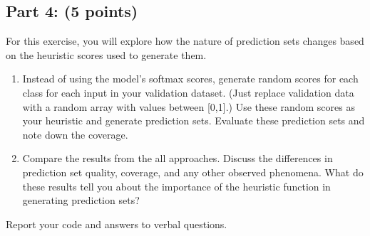 \documentclass[11pt, oneside]{article}   	%
\begin{document}
\subsection*{Part 4: (5 points)} 
For this exercise, you will explore how the nature of prediction sets changes based on the heuristic scores used to generate them.
\begin{enumerate}
    \item Instead of using the model's softmax scores, generate random scores for each class for each input in your validation dataset. (Just replace validation data with a random array with values between [0,1].) Use these random scores as your heuristic and generate prediction sets. Evaluate these prediction sets and note down the coverage.
    \item Compare the results from the all approaches. Discuss the differences in prediction set quality, coverage, and any other observed phenomena. What do these results tell you about the importance of the heuristic function in generating prediction sets? 
\end{enumerate}

Report your code and answers to verbal questions.

 
\end{document}
